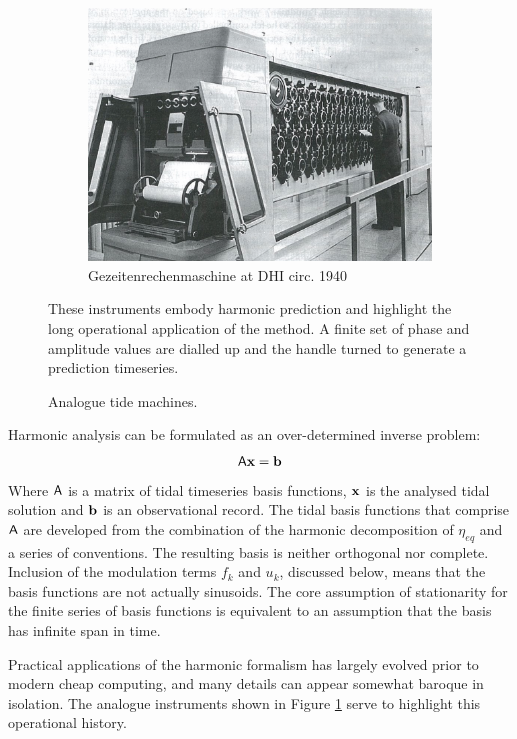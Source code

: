 \begin{figure}[!hbt]
\begin{subfigure}[t]{\figwidthHalf}
    	\includegraphics[width=\textwidth]{figures/images/DHI_machine_cartwright_fig11p2.png}
	    \caption{Gezeitenrechenmaschine at DHI circ. 1940 }
	\end{subfigure}
	\caption{Analogue tide machines.}{These instruments embody harmonic prediction and highlight the long operational application of the method.  A finite set of phase and amplitude values are dialled up and the handle turned to generate a prediction timeseries.}
	\label{fig:tide_machines}
\end{figure}
Harmonic analysis can be formulated as an over-determined inverse problem:
\begin{equation}
    \label{E:Axb}   
    \mathsf{A} \mathbf{x}=\mathbf{b} 
\end{equation}
Where $\mathsf{A}$ is a matrix of tidal timeseries basis functions, $\mathbf{x}$ is the analysed tidal solution and $\mathbf{b}$ is an observational record. The tidal basis functions that comprise $\mathsf{A}$ are developed from the combination of the harmonic decomposition of $\eta_{eq}$ and a series of conventions.  The resulting basis is neither orthogonal nor complete. Inclusion of the modulation terms $f_k$ and $u_k$, discussed below, means that the basis functions are not actually sinusoids. The core assumption of stationarity for the finite series of basis functions is equivalent to an assumption that the basis has infinite span in time.   

Practical applications of the harmonic formalism has largely evolved prior to modern cheap computing, and many details can appear somewhat baroque in isolation.  The analogue instruments shown in Figure \ref{fig:tide_machines} serve to highlight this operational history.


